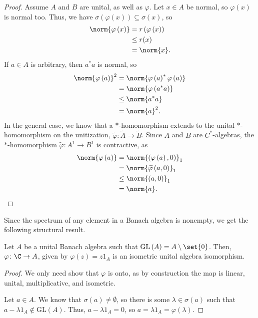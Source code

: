 \documentclass[10pt]{mypackage}
\newcommand{\GL}{\text{GL}}
\begin{document}
\begin{proof}
Assume $A$ and $B$ are unital, as well as $\varphi$. Let $x\in A$ be normal, so $\varphi\left(x\right)$ is normal too. Thus, we have $\sigma\left(\varphi\left(x\right)\right)\subseteq \sigma\left(x\right)$, so
\begin{align*}
  \norm{\varphi\left(x\right)} &= r\left(\varphi\left(x\right)\right)\\
                               &\leq r(x)\\
                               &= \norm{x}.
\end{align*}
If $a\in A$ is arbitrary, then $a^{\ast}a$ is normal, so
\begin{align*}
  \norm{\varphi\left(a\right)}^2 &= \norm{\varphi\left(a\right)^{\ast}\varphi\left(a\right)}\\
                                 &= \norm{\varphi\left(a^{\ast}a\right)}\\
                                 &\leq \norm{a^{\ast}a}\\
                                 &= \norm{a}^2.
\end{align*}
In the general case, we know that a $\ast$-homomorphism extends to the unital $\ast$-homomorphism on the unitization, $\widetilde{\varphi}\colon \widetilde{A}\rightarrow \widetilde{B}$. Since $A$ and $B$ are $C^{\ast}$-algebras, the $\ast$-homomorphism $\widetilde{\varphi}\colon A^{1}\rightarrow B^{1}$ is contractive, as
\begin{align*}
  \norm{\varphi\left(a\right)}&= \norm{\left(\varphi\left(a\right),0\right)}_1\\
                              &= \norm{\widetilde{\varphi}\left(a,0\right)}_1\\
                              &\leq \norm{\left(a,0\right)}_1\\
                              &= \norm{a}.
\end{align*}
\end{proof}
Since the spectrum of any element in a Banach algebra is nonempty, we get the following structural result.
\begin{theorem}
  Let $A$ be a unital Banach algebra such that $\GL\left(A\right) = A\setminus \set{0}$. Then, $\varphi\colon \C\rightarrow A$, given by $\varphi\left(z\right) = z1_A$ is an isometric unital algebra isomorphism.
\end{theorem}
\begin{proof}
  We only need show that $\varphi$ is onto, as by construction the map is linear, unital, multiplicative, and isometric.\newline

  Let $a\in A$. We know that $\sigma\left(a\right)\neq \emptyset$, so there is some $\lambda\in \sigma\left(a\right)$ such that $a-\lambda 1_A\notin \GL\left(A\right)$. Thus, $a-\lambda 1_A = 0$, so $a = \lambda 1_A = \varphi\left(\lambda\right)$.
\end{proof}
\end{document}
